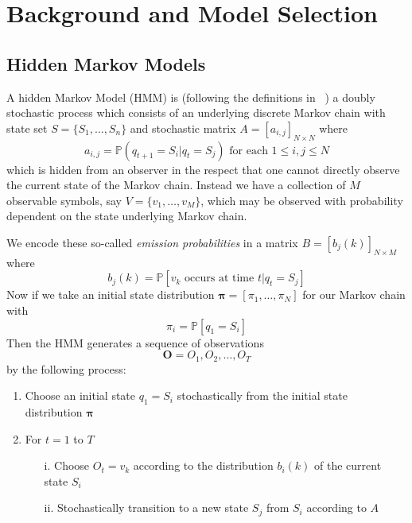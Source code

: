 
\chapter{Background and Model Selection}
\ifpdf
    \graphicspath{{Chapter1/Chapter1Figs/PNG/}{Chapter1/Chapter1Figs/PDF/}{Chapter1/Chapter1Figs/}}
\else
    \graphicspath{{Chapter1/Chapter1Figs/EPS/}{Chapter1/Chapter1Figs/}}
\fi

\section{Hidden Markov Models}
A hidden Markov Model (HMM) is (following the definitions in ~\cite{rabiner1989tutorial}) a doubly stochastic process which consists of an underlying discrete Markov chain with state set $S = \{S_1, \dots, S_n \}$ and stochastic matrix $A=[a_{i,j}]_{N\times N}$ where 
\begin{equation*}
a_{i,j} = \mathbb{P}(q_{t+1} = S_i | q_t = S_j) \text{  for each  } 1 \leq i,j \leq N
\end{equation*}
which is hidden from an observer in the respect that one cannot directly observe the current state of the Markov chain. Instead we have a collection of $M$ observable symbols, say $V = \{ v_1, \dots, v_M\}$, which may be observed with probability dependent on the state underlying Markov chain. 

We encode these so-called \emph{emission probabilities} in a matrix $B = [b_j(k)]_{N\times M}$ where
\begin{equation*}
b_j(k) = \mathbb{P}[v_k \text{ occurs at time }t | q_t = S_j] 
\end{equation*}
Now if we take an initial state distribution $\bm{\pi} = [\pi_1, \dots, \pi_N]$ for our Markov chain with
\begin{equation*}
\pi_i= \mathbb{P}[q_1 = S_i]
\end{equation*}
Then the HMM generates a sequence of observations
\begin{equation*}
\bm{O} = O_1, O_2, \ldots , O_T
\end{equation*}
by the following process:
\begin{enumerate}
\item Choose an initial state $q_1 = S_i$ stochastically from the initial state distribution $\bm{\pi}$
\item For $t=1$ to $T$
\begin{enumerate}
\item[i.] Choose $O_t = v_k$ according to the distribution $b_i(k)$ of the current state $S_i$
\item[ii.] Stochastically transition to a new state $S_j$ from $S_i$ according to $A$ 
\end{enumerate}
\end{enumerate}


